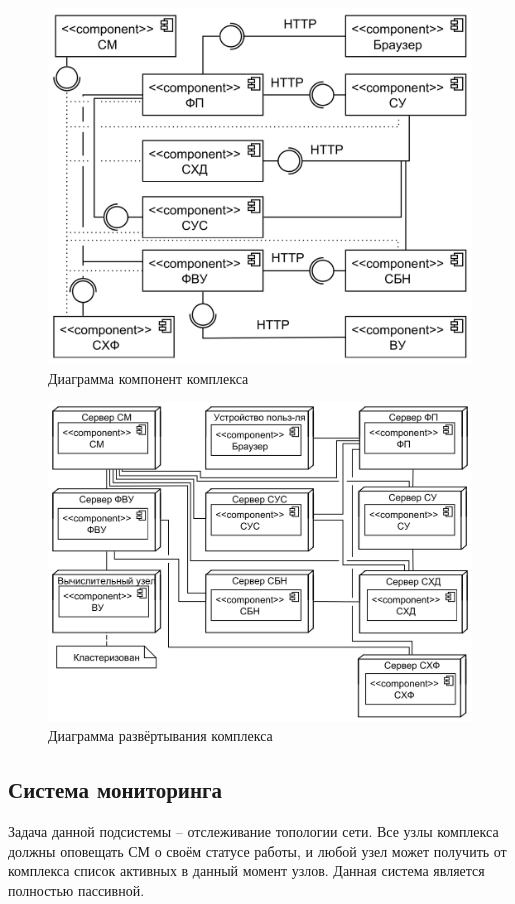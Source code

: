 \documentclass[a4paper,12pt]{report}
\numberwithin{equation}{section}
\begin{document}
  \begin{figure}[b]
    \centering
    \includegraphics[width=.7\linewidth]{diagrams/common/component}
    \caption{Диаграмма компонент комплекса}
    \label{fig:comp-common}
  \end{figure}
  
  \begin{figure}
    \centering
    \includegraphics[width=\linewidth]{diagrams/common/deployment}
    \caption{Диаграмма развёртывания комплекса}
    \label{fig:depl-common}
  \end{figure}
  
  \subsection{Система мониторинга}
  Задача данной подсистемы -- отслеживание топологии сети.
  Все узлы комплекса должны оповещать СМ о своём статусе работы, 
  и любой узел может получить от комплекса список активных в данный момент узлов.
  Данная система является полностью пассивной.
  
\end{document}
